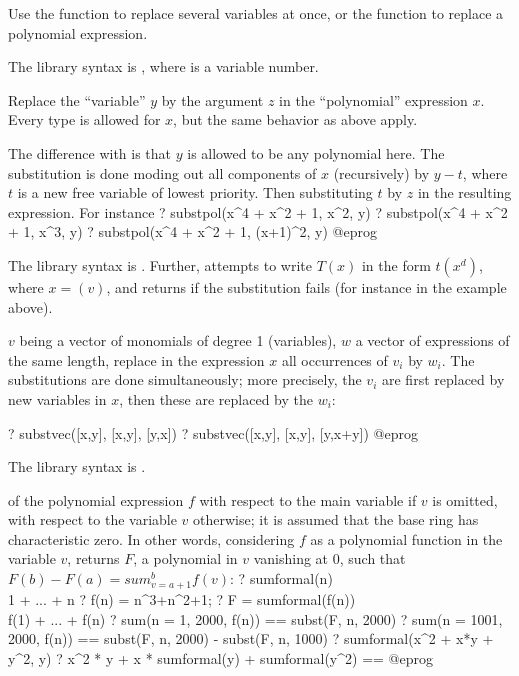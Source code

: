 Use the function  to replace several variables at once,
or the function  to replace a polynomial expression.

The library syntax is , where  is a variable number.

\label{se:substpol}
Replace the ``variable'' $y$ by the argument $z$ in the ``polynomial''
expression $x$. Every type is allowed for $x$, but the same behavior
as  above apply.

The difference with  is that $y$ is allowed to be any polynomial
here. The substitution is done moding out all components of $x$
(recursively) by $y - t$, where $t$ is a new free variable of lowest
priority. Then substituting $t$ by $z$ in the resulting expression. For
instance
\bprog
? substpol(x^4 + x^2 + 1, x^2, y)
? substpol(x^4 + x^2 + 1, x^3, y)
? substpol(x^4 + x^2 + 1, (x+1)^2, y)
@eprog

The library syntax is .
Further,  attempts to
write $T(x)$ in the form $t(x^d)$, where $x=$$(v)$, and returns
 if the substitution fails (for instance in the example 
above).

\label{se:substvec}
$v$ being a vector of monomials of degree 1 (variables),
$w$ a vector of expressions of the same length, replace in the expression
$x$ all occurrences of $v_i$ by $w_i$. The substitutions are done
simultaneously; more precisely, the $v_i$ are first replaced by new
variables in $x$, then these are replaced by the $w_i$:

\bprog
? substvec([x,y], [x,y], [y,x])
? substvec([x,y], [x,y], [y,x+y])
@eprog

The library syntax is .

\label{se:sumformal}
 of the polynomial expression $f$ with respect to the
main variable if $v$ is omitted, with respect to the variable $v$ otherwise;
it is assumed that the base ring has characteristic zero. In other words,
considering $f$ as a polynomial function in the variable $v$,
returns $F$, a polynomial in $v$ vanishing at $0$, such that $F(b) - F(a)
= sum_{v = a+1}^b f(v)$:
\bprog
? sumformal(n)  \\ 1 + ... + n
? f(n) = n^3+n^2+1;
? F = sumformal(f(n))  \\ f(1) + ... + f(n)
? sum(n = 1, 2000, f(n)) == subst(F, n, 2000)
? sum(n = 1001, 2000, f(n)) == subst(F, n, 2000) - subst(F, n, 1000)
? sumformal(x^2 + x*y + y^2, y)
? x^2 * y + x * sumformal(y) + sumformal(y^2) == %
@eprog

